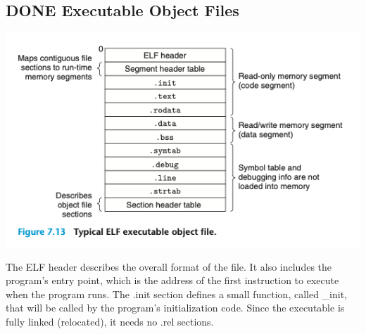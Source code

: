 \documentclass[11pt]{article}
\begin{document}
\subsection{{\bfseries\sffamily DONE} Executable Object Files}
\label{sec:orgf3547c5}

\begin{center}
\includegraphics[width=.9\linewidth]{pics/figure7.13-typical-elf-executable-object-file.png}
\end{center}

The ELF header describes the overall format of the file. It also includes the program’s entry point, which is the address of the first instruction to execute when the program runs. The .init section defines a small function, called \_init, that will be called by the program’s initialization code. Since the executable is fully linked (relocated), it needs no .rel sections.\\
\end{document}
